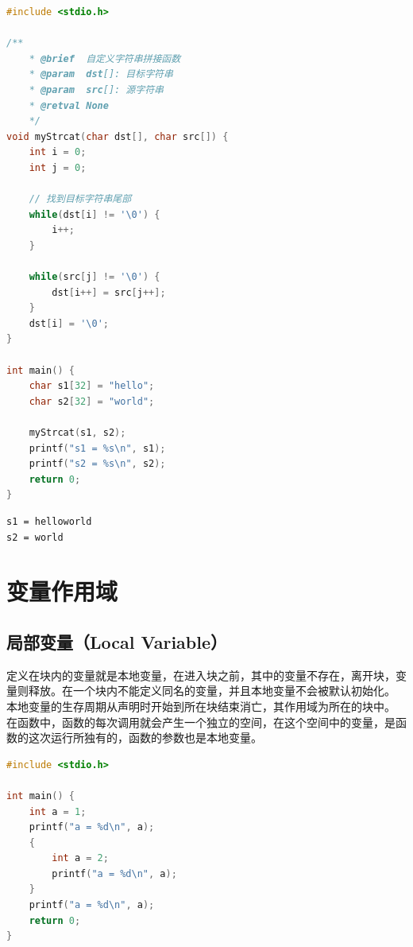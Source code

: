
\begin{lstlisting}[language=C]
#include <stdio.h>

/**
	* @brief  自定义字符串拼接函数
	* @param  dst[]: 目标字符串
	* @param  src[]: 源字符串
	* @retval None
	*/
void myStrcat(char dst[], char src[]) {
	int i = 0;
	int j = 0;

	// 找到目标字符串尾部
	while(dst[i] != '\0') {
		i++;
	}

	while(src[j] != '\0') {
		dst[i++] = src[j++];
	}
	dst[i] = '\0';
}

int main() {
	char s1[32] = "hello";
	char s2[32] = "world";

	myStrcat(s1, s2);
	printf("s1 = %s\n", s1);
	printf("s2 = %s\n", s2);
	return 0;
}
\end{lstlisting}

\begin{tcolorbox}
	\begin{verbatim}
s1 = helloworld
s2 = world
	\end{verbatim}
\end{tcolorbox}

\newpage

\section{变量作用域}

\subsection{局部变量（Local Variable）}

定义在块内的变量就是本地变量，在进入块之前，其中的变量不存在，离开块，变量则释放。在一个块内不能定义同名的变量，并且本地变量不会被默认初始化。\\

本地变量的生存周期从声明时开始到所在块结束消亡，其作用域为所在的块中。\\

在函数中，函数的每次调用就会产生一个独立的空间，在这个空间中的变量，是函数的这次运行所独有的，函数的参数也是本地变量。\\


\begin{lstlisting}[language=C]
#include <stdio.h>

int main() {
	int a = 1;
	printf("a = %d\n", a);
	{
		int a = 2;
		printf("a = %d\n", a);
	}
	printf("a = %d\n", a);
	return 0;
}
\end{lstlisting}

